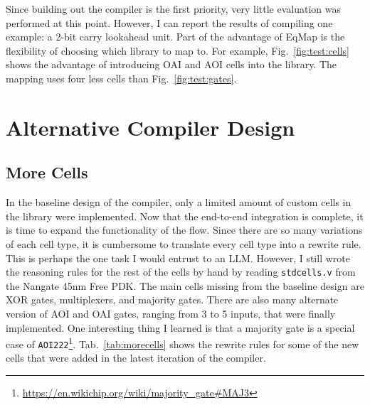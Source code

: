 \documentclass[10pt,letterpaper]{article}
\begin{document}
Since building out the compiler is the first priority, very little evaluation
was performed at this point. However, I can report the results of compiling one
example: a 2-bit carry lookahead unit. Part of the advantage of EqMap is the
flexibility of choosing which library to map to. For example,
Fig.~\ref{fig:test:cells} shows the advantage of introducing OAI and AOI cells
into the library. The mapping uses four less cells than
Fig.~\ref{fig:test:gates}.

\section{Alternative Compiler Design}\label{sec:alt}

\subsection{More Cells}\label{sec:alt:cells}

In the baseline design of the compiler, only a limited amount of custom cells
in the library were implemented. Now that the end-to-end integration is
complete, it is time to expand the functionality of the flow. Since there are
so many variations of each cell type, it is cumbersome to translate every cell
type into a rewrite rule. This is perhaps the one task I would entrust to an
LLM. However, I still wrote the reasoning rules for the rest of the cells by
hand by reading \texttt{stdcells.v} from the Nangate 45nm Free PDK. The main
cells missing from the baseline design are XOR gates, multiplexers, and
majority gates. There are also many alternate version of AOI and OAI gates,
ranging from 3 to 5 inputs, that were finally implemented. One interesting
thing I learned is that a majority gate is a special case of
\texttt{AOI222}\footnote{\href{https://en.wikichip.org/wiki/majority\_gate\#MAJ3}{https://en.wikichip.org/wiki/majority\_gate\#MAJ3}}.
Tab.~\ref{tab:morecells} shows the rewrite rules for some of the new cells that
were added in the latest iteration of the compiler.
\end{document}
